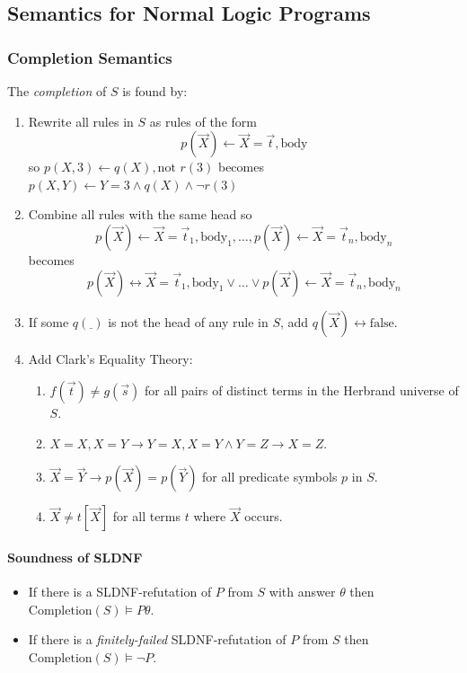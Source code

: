 \documentclass[twocolumn,english]{article}
\begin{document}
\subsection{Semantics for Normal Logic Programs}

\subsubsection{Completion Semantics}

The \emph{completion} of $S$ is found by:
\begin{enumerate}
\item Rewrite all rules in $S$ as rules of the form
\[
p\left(\overrightarrow{X}\right)\leftarrow\overrightarrow{X}=\overrightarrow{t},\text{body}
\]
so $p\left(X,3\right)\leftarrow q\left(X\right),\text{not }r\left(3\right)$
becomes $p\left(X,Y\right)\leftarrow Y=3\land q\left(X\right)\land\lnot r\left(3\right)$
\item Combine all rules with the same head so 
\[
p\left(\overrightarrow{X}\right)\leftarrow\overrightarrow{X}=\overrightarrow{t}_{1},\text{body}_{1},\dots,p\left(\overrightarrow{X}\right)\leftarrow\overrightarrow{X}=\overrightarrow{t}_{n},\text{body}_{n}
\]
becomes
\[
p\left(\overrightarrow{X}\right)\leftrightarrow\overrightarrow{X}=\overrightarrow{t}_{1},\text{body}_{1}\lor\dots\lor p\left(\overrightarrow{X}\right)\leftarrow\overrightarrow{X}=\overrightarrow{t}_{n},\text{body}_{n}
\]
\item If some $q\left(\underline{\;}\right)$ is not the head of any rule
in $S$, add $q\left(\overrightarrow{X}\right)\leftrightarrow\text{false}$.
\item Add Clark's Equality Theory:
\begin{enumerate}
\item $f\left(\overrightarrow{t}\right)\neq g\left(\overrightarrow{s}\right)$
for all pairs of distinct terms in the Herbrand universe of $S$.
\item $X=X,X=Y\rightarrow Y=X,X=Y\land Y=Z\rightarrow X=Z$.
\item $\overrightarrow{X}=\overrightarrow{Y}\rightarrow p\left(\overrightarrow{X}\right)=p\left(\overrightarrow{Y}\right)$
for all predicate symbols $p$ in $S$.
\item $\overrightarrow{X}\neq t\left[\overrightarrow{X}\right]$ for all
terms $t$ where $\overrightarrow{X}$ occurs.
\end{enumerate}
\end{enumerate}

\paragraph{Soundness of SLDNF}
\begin{itemize}
\item If there is a SLDNF-refutation of $P$ from $S$ with answer $\theta$
then $\text{Completion}\left(S\right)\vDash P\theta$.
\item If there is a \emph{finitely-failed} SLDNF-refutation of $P$ from
$S$ then $\text{Completion}\left(S\right)\vDash\lnot P$.
\end{itemize}
\end{document}

